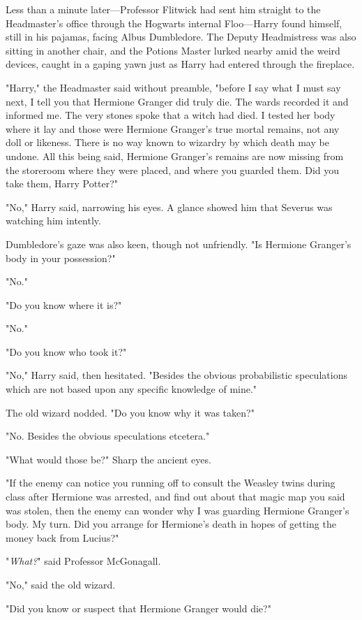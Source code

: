 Less than a minute later---Professor Flitwick had sent him straight to the 
Headmaster's office through the Hogwarts internal Floo---Harry found himself, 
still in his pajamas, facing Albus Dumbledore. The Deputy Headmistress was also 
sitting in another chair, and the Potions Master lurked nearby amid the weird 
devices, caught in a gaping yawn just as Harry had entered through the 
fireplace.

"Harry," the Headmaster said without preamble, "before I say what I must say 
next, I tell you that Hermione Granger did truly die. The wards recorded it and 
informed me. The very stones spoke that a witch had died. I tested her body 
where it lay and those were Hermione Granger's true mortal remains, not any 
doll or likeness. There is no way known to wizardry by which death may be 
undone. All this being said, Hermione Granger's remains are now missing from 
the storeroom where they were placed, and where you guarded them. Did you take 
them, Harry Potter?"

"No," Harry said, narrowing his eyes. A glance showed him that Severus was 
watching him intently.

Dumbledore's gaze was also keen, though not unfriendly. "Is Hermione Granger's 
body in your possession?"

"No."

"Do you know where it is?"

"No."

"Do you know who took it?"

"No," Harry said, then hesitated. "Besides the obvious probabilistic 
speculations which are not based upon any specific knowledge of mine."

The old wizard nodded. "Do you know why it was taken?"

"No. Besides the obvious speculations etcetera."

"What would those be?" Sharp the ancient eyes.

"If the enemy can notice you running off to consult the Weasley twins during 
class after Hermione was arrested, and find out about that magic map you said 
was stolen, then the enemy can wonder why I was guarding Hermione Granger's 
body. My turn. Did you arrange for Hermione's death in hopes of getting the 
money back from Lucius?"

"\emph{What?}" said Professor McGonagall.

"No," said the old wizard.

"Did you know or suspect that Hermione Granger would die?"


